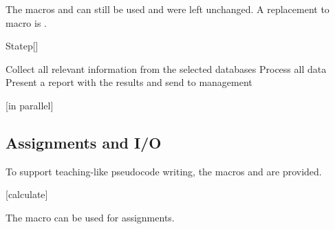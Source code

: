\documentclass[a4paper, 11pt]{article}
\begin{document}
The macros  and  can still be used and were left unchanged. A replacement to macro  is .

\begin{macro}{Statep}[]
\end{macro}

\begin{tcblisting}{}
    \begin{minipage}{6cm}
        \begin{algorithmic}
            \State Collect all relevant information from the selected databases
            \State Process all data
            \State Present a report with the results and send to management
        \end{algorithmic}

        \bigskip
        \begin{algorithmic}
            [in parallel]
        \end{algorithmic}
    \end{minipage}
\end{tcblisting}

\subsection{Assignments and I/O}\label{sec:assignments-and-i/o}

To support teaching-like pseudocode writing, the macros  and  are provided.

\begin{tcblisting}{}
    \begin{algorithmic}
        [calculate]
    \end{algorithmic}
\end{tcblisting}

The macro  can be used for assignments.

\end{document}
